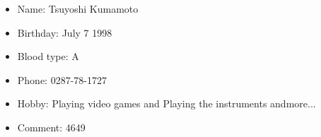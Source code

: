 \documentclass[a4paper,12pt]{jarticle}
\begin{document}
\begin{itemize}
  \item Name: Tsuyoshi Kumamoto
  \item Birthday: July 7 1998
  \item Blood type: A
  \item Phone: 0287-78-1727
  \item Hobby: Playing video games and Playing the instruments andmore...
  \item Comment: 4649
\end{itemize}
\end{document}
